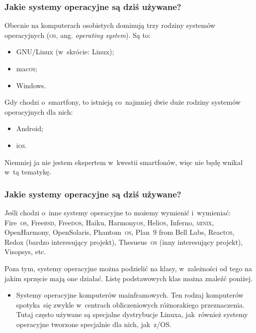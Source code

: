\documentclass[10pt,t]{beamer}
\begin{document}
\begin{frame}
  \frametitle{Jakie systemy operacyjne są dziś używane?}


  Obecnie na komputerach osobistych dominują trzy rodziny systemów
  operacyjnych (\textsc{os}, ang. \textit{operating system}). Są to:
  \begin{itemize}

  \item GNU/Linux (w~skrócie: Linux);

  \item mac\textsc{os};

  \item Windows.

  \end{itemize}

  Gdy chodzi o~smartfony, to istnieją co~najmniej dwie duże rodziny systemów
  operacyjnych dla nich:
  \begin{itemize}

  \item Android;

  \item i\textsc{os}.

  \end{itemize}
  Niemniej ja nie jestem ekspertem w~kwestii smartfonów, więc nie będę
  wnikał w~tą tematykę.


\end{frame}





\begin{frame}
  \frametitle{Jakie systemy operacyjne są dziś używane?}


  Jeśli chodzi o~inne systemy operacyjne to możemy wymienić i~wymieniać:
  Fire~\textsc{os}, Free\textsc{bsd}, Free\textsc{dos}, Haiku,
  Harmony\textsc{os}, Heli\textsc{os}, Inferno, \textsc{minix},
  OpenHarmony, OpenSolaris, Phantom~\textsc{os}, Plan~9
  from Bell Labs, React\textsc{os}, Redox (bardzo interesujący projekt),
  Thesueus~\textsc{os} (inny interesujący projekt), Visopsys, etc.

  Poza tym, systemy operacyjne można podzielić na klasy, w~zależności od
  tego na jakim sprzęcie mają one działać. Listę podstawowych klas można
  znaleźć poniżej.

  \begin{itemize}

  \item Systemy operacyjne komputerów mainframowych. Ten rodzaj komputerów
    spotyka~się zwykle w~centrach obliczeniowych różnorakiego
    przeznaczenia. Tutaj często używane są specjalne dystrybucje Linuxa,
    jak~również systemy operacyjne tworzone specjalnie dla nich, jak~z/OS.

  \end{itemize}

\end{frame}
\end{document}
